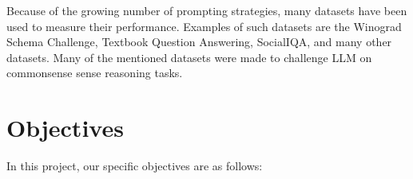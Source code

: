 \documentclass[fleqn,moreauthors,10pt]{ds_report}
\begin{document}
    Because of the growing number of prompting strategies, many datasets have been used to measure their performance. Examples of such datasets are the Winograd Schema Challenge\cite{levesque2012winograd}, Textbook Question Answering\cite{Kembhavi2017AreYS},  SocialIQA\cite{sap2019socialiqa}, and many other datasets. Many of the mentioned datasets were made to challenge LLM on commonsense sense reasoning tasks.

\section*{Objectives}
In this project, our specific objectives are as follows:
\end{document}
